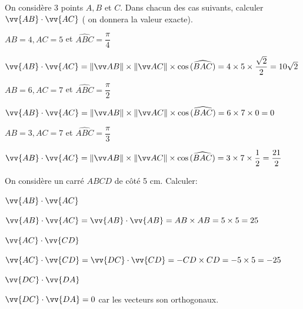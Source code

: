 \documentclass[a4paper,12pt]{article}        %
\begin{document}
On considère 3 points $A, B$ et $C$. Dans chacun des cas suivants, calculer $\vv{A B} \cdot \vv{A C}$ ( on donnera la valeur exacte).
	\begin{enumMet}
		\item $A B=4, A C=5$ et $\widehat{A B C}=\dfrac{\pi}{4}$
		\begin{corrBox}
			$\vv{AB}\cdot \vv{AC} = \normeB{AB}\times\normeB{AC}\times\cos{(\widehat{BAC})}=4\times5\times\dfrac{\sqrt{2}}{2}=10\sqrt{2}$   \quad {}
		\end{corrBox}
		\item $A B=6, A C=7$ et $\widehat{A B C}=\dfrac{\pi}{2}$
		\begin{corrBox}
			$\vv{AB}\cdot \vv{AC} = \normeB{AB}\times\normeB{AC}\times\cos{(\widehat{BAC})}=6\times7\times0=0$ \quad \bareme{0,5}
		\end{corrBox}
		\item $A B=3, A C=7$ et $\widehat{A B C}=\dfrac{\pi}{3}$
		\begin{corrBox}
			$\vv{AB}\cdot \vv{AC} = \normeB{AB}\times\normeB{AC}\times\cos{(\widehat{BAC})}=3\times7\times\dfrac{1}{2}=\dfrac{21}{2}$   \quad \bareme{1}
		\end{corrBox}
	\end{enumMet}
\newpage

\vspace{-0.3cm}
On considère un carré $A B C D$ de côté 5 cm. Calculer:
	\begin{enumMet}
		\item $\vv{A B} \cdot \vv{A C}$
		\begin{corrBox}
			$\vv{A B} \cdot \vv{A C}=\vv{A B} \cdot \vv{A B}=AB\times AB=5\times 5=25$  \quad \bareme{1}
		\end{corrBox}
		\item $\vv{AC} \cdot \vv{C D}$
		\begin{corrBox}
			$\vv{A C} \cdot \vv{CD}=\vv{DC} \cdot \vv{CD}=-CD\times CD=-5\times 5=-25$  \quad \bareme{1}
		\end{corrBox}
		\item $\vv{D C} \cdot \vv{D A}$
		\begin{corrBox}
			$\vv{DC} \cdot \vv{DA}=0$ car les vecteurs son orthogonaux.  \quad {}
		\end{corrBox}
	\end{enumMet}
\end{document}
